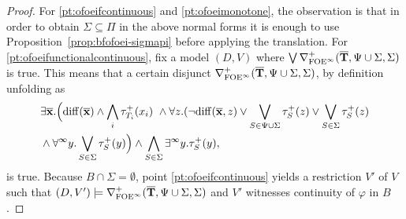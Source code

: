 \begin{proof}
	For \ref{pt:ofoeifcontinuous} and \ref{pt:ofoeimonotone}, the observation is that in order to obtain $\Sigma\subseteq\Pi$ in the above normal forms it is enough to use Proposition~\ref{prop:bfofoei-sigmapi} before applying the translation. For \ref{pt:ofoeifunctionalcontinuous}, fix a model $(D,V)$ where $\bigvee \mondbnfofoei{\vlist{T}}{\Psi \cup \Sigma}{\Sigma}{+}$ is true. This means that a certain disjunct $\mondbnfofoei{\vlist{T}}{\Psi \cup \Sigma}{ \Sigma}{+}$, by definition unfolding as
	\begin{equation}\label{eq:basicformolque}
	\begin{aligned}
&\exists \vlist{x}.\Big( \arediff{\vlist{x}} \land \bigwedge_i \tau^+_{T_i}(x_i)\ \land 
 \forall z.(\lnot\arediff{\vlist{x},z} \lor \bigvee_{S\in \Psi \cup \Sigma} \tau^+_S(z) \lor \bigvee_{S\in \Sigma} \tau^+_S(z)  \\
& \land \dqu y.\bigvee_{S\in\Sigma} \tau^+_S(y) \Big) \land \bigwedge_{S\in\Sigma} \qu y.\tau^+_S(y),
\end{aligned}
\end{equation}
is true. Because $B \cap \Sigma = \emptyset$, point \ref{pt:ofoeifcontinuous} yields a restriction $V'$ of $V$ such that $(D,V') \models \mondbnfofoei{\vlist{T}}{\Psi \cup \Sigma}{ \Sigma}{+}$ and $V'$ witnesses continuity of $\varphi$ in $B$. %


\end{proof}
